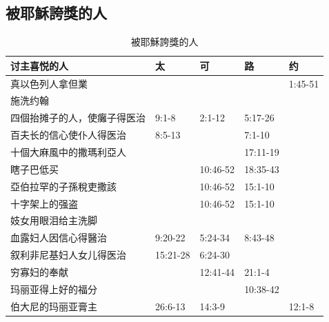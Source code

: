 \subsection{被耶穌誇獎的人}
\begin{table}[H]
  \centering  
    \begin{tabular}{l|r|r|r|l} \toprule
  \textbf{讨主喜悦的人} & \multicolumn{1}{l|}{\textbf{太}} & \multicolumn{1}{l|}{\textbf{可}} & \multicolumn{1}{l|}{\textbf{路}} & \textbf{约} \\ \midrule
真以色列人拿但業 &       &       &  &1:45-51  \\ \midrule 
施洗约翰  &       &       &       &  \\\midrule
四個抬摊子的人，使癱子得医治 & \multicolumn{1}{l|}{9:1-8} & \multicolumn{1}{l|}{2:1-12} & \multicolumn{1}{l|}{5:17-26} &  \\ \midrule
百夫长的信心使仆人得医治 & \multicolumn{1}{l|}{8:5-13} &       & \multicolumn{1}{l|}{7:1-10} &  \\ \midrule
十個大麻風中的撒瑪利亞人 & &  & \multicolumn{1}{l|}{17:11-19} &\\\midrule
瞎子巴低买 &       & \multicolumn{1}{l|}{10:46-52} & \multicolumn{1}{l|}{18:35-43} &  \\ \midrule
亞伯拉罕的子孫稅吏撒該&       & \multicolumn{1}{l|}{10:46-52} & \multicolumn{1}{l|}{15:1-10} &  \\ \midrule
十字架上的强盗&       & \multicolumn{1}{l|}{10:46-52} & \multicolumn{1}{l|}{15:1-10} &  \\ \midrule

妓女用眼泪给主洗脚 &       &       & \multicolumn{1}{l|}{} &  \\ \midrule
血露妇人因信心得醫治&\multicolumn{1}{l|}{9:20-22}&\multicolumn{1}{l|}{5:24-34}&\multicolumn{1}{l|}{8:43-48}&\\\midrule
叙利非尼基妇人女儿得医治 & \multicolumn{1}{l|}{15:21-28} & \multicolumn{1}{l|}{6:24-30} &       &  \\ \midrule
穷寡妇的奉献 &       & \multicolumn{1}{l|}{12:41-44} & \multicolumn{1}{l|}{21:1-4} &  \\  \midrule
玛丽亚得上好的福分 & \multicolumn{1}{l|}{} & \multicolumn{1}{l|}{ } & \multicolumn{1}{l|}{10:38-42 } &  \\ \midrule
伯大尼的玛丽亚膏主 & \multicolumn{1}{l|}{26:6-13} & \multicolumn{1}{l|}{14:3-9} & \multicolumn{1}{l|}{ } & 12:1-8 \\
    \bottomrule
    \end{tabular}%
    \caption{被耶穌誇獎的人}
  \label{tab:addlabel}%
\end{table}%


